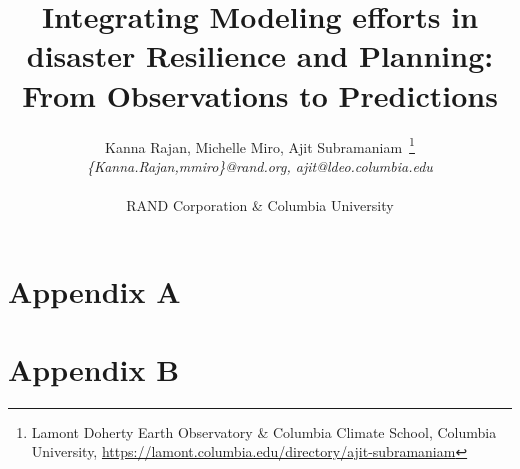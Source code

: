 \documentclass[11pt,letterpaper]{article}
\title{\Large{Integrating Modeling efforts in disaster Resilience and Planning:\\
    From Observations to Predictions}}
\author{\normalsize{Kanna Rajan, Michelle Miro, Ajit
      Subramaniam~\footnote{Lamont Doherty Earth Observatory \&
        Columbia Climate School, \newline Columbia University,
        \url{https://lamont.columbia.edu/directory/ajit-subramaniam}}
    }\\
  \emph{\{Kanna.Rajan,mmiro\}@rand.org, ajit@ldeo.columbia.edu}\\ \\
  RAND Corporation \& Columbia University}
\begin{document}
\maketitle{}




\newpage
\section{Appendix A}

\section{Appendix B}


% 



% 
\end{document}
